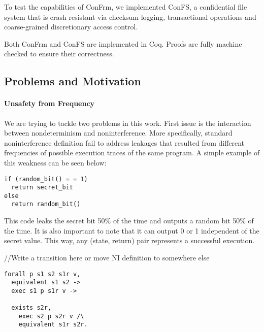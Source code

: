 \documentclass[onecolumn]{paper}
\begin{document}
To test the capabilities of ConFrm, we implemented ConFS, a confidential file system that is crash resistant via checksum logging, transactional operations and coarse-grained discretionary access control. 

Both ConFrm and ConFS are implemented in Coq. Proofs are fully machine checked to ensure their correctness. 


\subsection*{Problems and Motivation}
\paragraph{Unsafety from Frequency}
We are trying to tackle two problems in this work. First issue is the interaction between nondeterminism and noninterference. More specifically, standard noninterference definition fail to address leakages that resulted from different frequencies of possible execution traces of the same program. A simple example of this weakness can be seen below: 


\begin{lstlisting}
if (random_bit() = = 1)
  return secret_bit
else
  return random_bit()
\end{lstlisting}

This code leaks the secret bit 50\% of the time and outputs a random bit 50\% of the time. It is also important to note that it can output 0 or 1 independent of the secret value. This way, any (state, return) pair represents a successful execution. 


//Write a transition here or move NI definition to somewhere else


\begin{lstlisting}
forall p s1 s2 s1r v,
  equivalent s1 s2 ->
  exec s1 p s1r v ->
	
  exists s2r,
    exec s2 p s2r v /\
    equivalent s1r s2r.
\end{lstlisting} 
\end{document}
